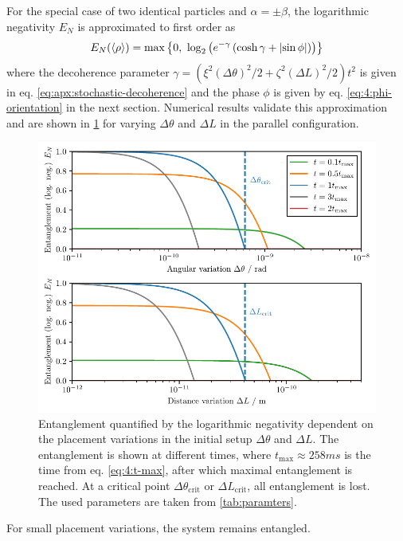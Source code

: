 For the special case of two identical particles and $\alpha=\pm\beta$, the logarithmic negativity $E_N$ is approximated to first order as
\begin{equation}\label{eq:4:log-neg-analytical}
  E_N(\mean{\rho}) = \max\left\{ 0,\ \log_2\left(e^{-\gamma}\left(\cosh\gamma + \abs{\sin \phi}\right)\right) \right\}
\end{equation}
where the decoherence parameter $\gamma = \left(\xi^2(\Delta \theta)^2/2 + \zeta^2(\Delta L)^2/2\right)t^2$ is given in eq. \eqref{eq:apx:stochastic-decoherence} and the phase $\phi$ is given by eq. \eqref{eq:4:phi-orientation} in the next section.
Numerical results validate this approximation and are shown in \cref{fig:4:EN-variations} for varying $\Delta \theta$ and $\Delta L$ in the parallel configuration.
\begin{figure}[!htb]
  \centering
  \includegraphics[width=\textwidth]{./../figures/theta-variance/EN-deltaTheta-deltaL.pdf}
  \caption{Entanglement quantified by the logarithmic negativity dependent on the placement variations in the initial setup $\Delta \theta$ and $\Delta L$. The entanglement is shown at different times, where $t_\mathrm{max} \approx 258\si{ms}$ is the time from eq. \eqref{eq:4:t-max}, after which maximal entanglement is reached. At a critical point $\Delta \theta_\mathrm{crit}$ or $\Delta L_\mathrm{crit}$, all entanglement is lost. The used parameters are taken from \cref{tab:paramters}.}
  \label{fig:4:EN-variations}
\end{figure}
For small placement variations, the system remains entangled.
